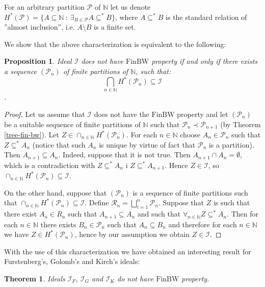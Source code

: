 \documentclass{amsart}
\newtheorem{thm}{Theorem}
\newtheorem{prop}{Proposition}
\theoremstyle{definition}
\theoremstyle{definition}
\newcommand{\N}{{\mathbb N}}
\newcommand{\I}{\mathcal I}
\newcommand{\finbw}{\text{FinBW}}
\DeclareMathOperator{\Exists}{\exists}
\begin{document}
For an arbitrary partition $\mathcal{P}$ of $\N$ 
let us denote \\$H^{*}(\mathcal{P}) = \{A\subseteq\N\ :\ \Exists_{B\in\mathcal{P}} A\subseteq^{*} B\}$, 
where $A\subseteq^{*} B$ is the standard relation of ''almost inclusion'', i.e. 
$A\setminus B$ is a finite set.

We show that the above characterization is equivalent to the following:

\begin{prop}
Ideal $\I$ does not have $\finbw$ property if and only if there exists a sequence $(\mathcal{P}_n)$ of finite partitions of $\N$, such that: 
$$\bigcap_{n\in\N} H^{*}(\mathcal{P}_n)\subseteq\I$$.
\end{prop}

\begin{proof}
Let us assume that $\I$ does not have the $\finbw$ property and let
$(\mathcal{P}_n)$ be a suitable sequence of finite partitions of $\N$
such that $\mathcal{P}_n \prec \mathcal{P}_{n + 1}$ (by Theorem \ref{tree-fin-bw}). 
Let $Z \in \cap_{n\in\N} H^{*}(\mathcal{P}_n)$. For each $n\in\N$ choose $A_n\in \mathcal{P}_n$
such that $Z \subseteq^* A_n$ (notice that such $A_n$ is unique by virtue of fact that  
$\mathcal{P}_n$ is a partition). Then $A_{n+1} \subseteq A_n$. 
Indeed, suppose that it is not true.
Then $A_{n+1} \cap A_n = \emptyset$, which is a contradiction with $Z \subseteq^* A_n$ i $Z \subseteq^* A_{n + 1}$. 
Hence $Z \in \I$, so $\cap_{n\in\N} H^{*}(\mathcal{P}_n) \subseteq \I$.

On the other hand, suppose that $(\mathcal{P}_n)$ is a sequence 
of finite partitions such that $\cap_{n\in\N} H^{*}(\mathcal{P}_n) \subseteq \I$. 
Define $\mathcal{R}_n = \bigsqcup_{i=1}^n \mathcal{P}_n$. 
Suppose that $Z$ is such that there exist $A_n \in R_n$ such that $A_{n+1} \subseteq A_n$ and such that 
$\forall_{n\in\N} Z \subseteq^* A_n$. Then for each $n\in\N$ there exists $B_n \in \mathcal{P}_n$ 
such that $A_n \subseteq B_n$ and therefore for each $n\in\N$ we have $Z \in H^{*}(\mathcal{P}_n)$, 
hence by our assumption we obtain $Z\in\I$.
\end{proof}

With the use of this characterization we have obtained an interesting result for Furstenberg's, Golomb's and Kirch's ideals: 

\begin{thm}
Ideals $\I_F$, $\I_G$ and $\I_K$ do not have $\finbw$ property.
\end{thm}
\end{document}
